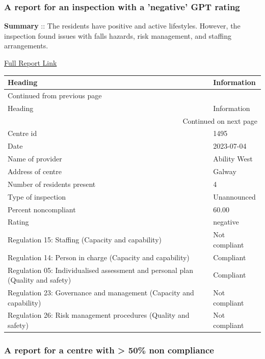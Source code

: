 \documentclass[a4paper,11pt,twoside]{article}
\begin{document}
\subsubsection{A report for an inspection with a 'negative' GPT rating}
\label{sec:orgd6693fb}

\textbf{Summary} :: The residents have positive and active lifestyles. However, the inspection found issues with falls hazards, risk management, and staffing arrangements.

\href{https://www.hiqa.ie/system/files?file=inspectionreports/1495-ocean-wave-services-04-july-2023.pdf}{Full Report Link}


\begin{longtable}{p{11cm}|p{5cm}}
Heading & Information\\[0pt]
\hline
\endfirsthead
\multicolumn{2}{l}{Continued from previous page} \\[0pt]
\hline

Heading & Information \\[0pt]

\hline
\endhead
\hline\multicolumn{2}{r}{Continued on next page} \\
\endfoot
\endlastfoot
\hline
Centre id & 1495\\[0pt]
Date & 2023-07-04\\[0pt]
Name of provider & Ability West\\[0pt]
Address of centre & Galway\\[0pt]
Number of residents present & 4\\[0pt]
Type of inspection & Unannounced\\[0pt]
Percent noncompliant & 60.00\\[0pt]
Rating & negative\\[0pt]
Regulation 15: Staffing (Capacity and capability) & Not compliant\\[0pt]
Regulation 14: Person in charge (Capacity and capability) & Compliant\\[0pt]
Regulation 05: Individualised assessment and personal plan (Quality and safety) & Compliant\\[0pt]
Regulation 23: Governance and management (Capacity and capability) & Not compliant\\[0pt]
Regulation 26: Risk management procedures (Quality and safety) & Not compliant\\[0pt]
\end{longtable}
\subsubsection{A report for a centre with > 50\% non compliance}
\label{sec:org3f8c663}
\end{document}
